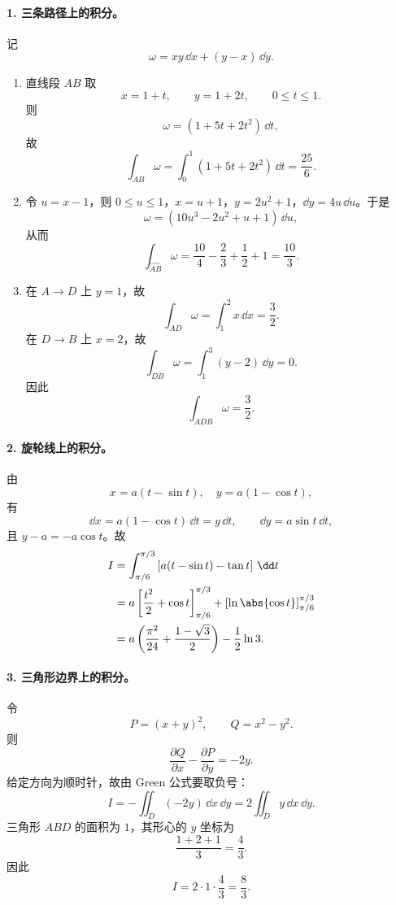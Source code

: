 \paragraph{1. 三条路径上的积分。}
\begin{xsolution}
记
\[
  \omega=xy\,\dd x+(y-x)\,\dd y.
\]
\begin{enumerate}[label=(\arabic*)]
\item 直线段 $AB$ 取
\[
  x=1+t,\qquad y=1+2t,\qquad0\le t\le1.
\]
则
\[
  \omega=(1+5t+2t^2)\,\dd t,
\]
故
\[
  \int_{AB}\omega=\int_0^1(1+5t+2t^2)\,\dd t=\frac{25}{6}.
\]

\item 令 $u=x-1$，则 $0\le u\le1$，$x=u+1$，$y=2u^2+1$，$\dd y=4u\,\dd u$。于是
\[
  \omega=(10u^3-2u^2+u+1)\,\dd u,
\]
从而
\[
  \int_{\wideparen{AB}}\omega=\frac{10}{4}-\frac23+\frac12+1=\frac{10}{3}.
\]

\item 在 $A\to D$ 上 $y=1$，故
\[
  \int_{AD}\omega=\int_1^2x\,\dd x=\frac32.
\]
在 $D\to B$ 上 $x=2$，故
\[
  \int_{DB}\omega=\int_1^3(y-2)\,\dd y=0.
\]
因此
\[
  \int_{ADB}\omega=\frac32.
\]
\end{enumerate}
\end{xsolution}

\paragraph{2. 旋轮线上的积分。}
\begin{xsolution}
由
\[
  x=a(t-\sin t),\quad y=a(1-\cos t),
\]
有
\[
  \dd x=a(1-\cos t)\,\dd t=y\,\dd t,
  \qquad
  \dd y=a\sin t\,\dd t,
\]
且 $y-a=-a\cos t$。故
\begin{align*}
  I
  &=\int_{\pi/6}^{\pi/3}
  \left[a(t-\sin t)-\tan t\right]\,\dd t\\
  &=a\left[\frac{t^2}{2}+\cos t\right]_{\pi/6}^{\pi/3}
    +\left[\ln\abs{\cos t}\right]_{\pi/6}^{\pi/3}\\
  &=a\left(\frac{\pi^2}{24}+\frac{1-\sqrt3}{2}\right)
    -\frac12\ln3.
\end{align*}
\end{xsolution}

\paragraph{3. 三角形边界上的积分。}
\begin{xsolution}
令
\[
  P=(x+y)^2,\qquad Q=x^2-y^2.
\]
则
\[
  \frac{\partial Q}{\partial x}-\frac{\partial P}{\partial y}
  =-2y.
\]
给定方向为顺时针，故由 Green 公式要取负号：
\[
  I=-\iint_D(-2y)\,\dd x\,\dd y
   =2\iint_Dy\,\dd x\,\dd y.
\]
三角形 $ABD$ 的面积为 $1$，其形心的 $y$ 坐标为
\[
  \frac{1+2+1}{3}=\frac43.
\]
因此
\[
  I=2\cdot1\cdot\frac43=\frac83.
\]
\end{xsolution}

